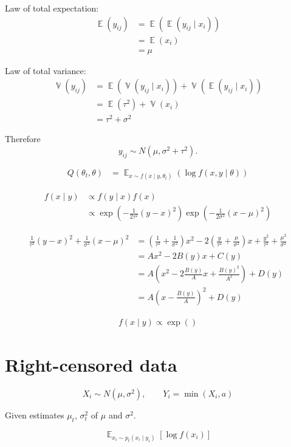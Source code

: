\documentclass{amsart}
\DeclareMathOperator{\Exp}{\mathbb{E}}
\DeclareMathOperator{\Var}{\mathbb{V}}
\begin{document}
Law of total expectation:
\begin{align*}
    \Exp(y_{ij}) &= \Exp(\Exp(y_{ij}\mid x_i))\\
    &= \Exp(x_i)\\
    &= \mu
\end{align*}

Law of total variance:
\begin{align*}
    \Var(y_{ij}) &= \Exp(\Var(y_{ij}\mid x_i)) + \Var(\Exp(y_{ij}\mid x_i))\\
    &= \Exp(\tau^2) + \Var(x_i)\\
    &= \tau^2 + \sigma^2
\end{align*}

Therefore
\[
y_{ij}\sim N(\mu, \sigma^2 + \tau^2).
\]

\begin{align*}
    Q(\theta_t, \theta) &= \Exp_{x\sim f(x\mid y, \theta_t)}\left(\log f(x, y\mid\theta)\right)
\end{align*}


\begin{align*}
f(x\mid y) &\propto f(y\mid x)f(x)\\
&\propto \exp\left(-\frac1{2\tau^2}(y - x)^2\right)
\exp\left(-\frac1{2\sigma^2}(x - \mu)^2\right)
\end{align*}

\begin{align*}
\frac1{\tau^2}(y - x)^2 + \frac1{\sigma^2}(x - \mu)^2
&= \left(\frac1{\tau^2} + \frac1{\sigma^2}\right)x^2 - 2\left(\frac{y}{\tau^2} + \frac{\mu}{\sigma^2}\right)x + \frac{y^2}{\tau^2} + \frac{\mu^2}{\sigma^2}\\
&= Ax^2 -2B(y)x + C(y)\\
&= A\left(x^2 - 2\frac{B(y)}{A}x + \frac{B(y)^2}{A^2}\right) + D(y)\\
&= A\left(x - \frac{B(y)}{A}\right)^2 + D(y)
\end{align*}


\begin{align*}
    f(x\mid y)\propto \exp\left(\right)
\end{align*}

\section{Right-censored data}
\[
X_i\sim N(\mu,\sigma^2),\qquad Y_i = \min(X_i, a)
\]

Given estimates $\mu_t$, $\sigma_t^2$ of $\mu$ and $\sigma^2$.

\[
\Exp_{x_i\sim p_t(x_i\mid y_i)}\left[\log f(x_i)\right]
\]
\end{document}
